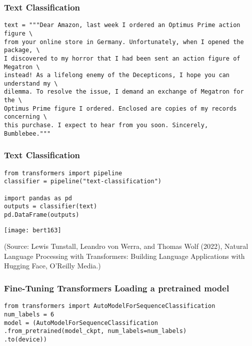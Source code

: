 \begin{frame}[fragile]\frametitle{Text Classification}

\begin{lstlisting}
text = """Dear Amazon, last week I ordered an Optimus Prime action figure \
from your online store in Germany. Unfortunately, when I opened the package, \
I discovered to my horror that I had been sent an action figure of Megatron \
instead! As a lifelong enemy of the Decepticons, I hope you can understand my \
dilemma. To resolve the issue, I demand an exchange of Megatron for the \
Optimus Prime figure I ordered. Enclosed are copies of my records concerning \
this purchase. I expect to hear from you soon. Sincerely, Bumblebee."""
\end{lstlisting}
			
\end{frame}

\begin{frame}[fragile]\frametitle{Text Classification}

\begin{lstlisting}
from transformers import pipeline
classifier = pipeline("text-classification")

import pandas as pd
outputs = classifier(text)
pd.DataFrame(outputs) 
\end{lstlisting}
			
			
			\begin{center}
			\texttt{[image: bert163]}
			\end{center}	
			
			
			{\tiny (Source: Lewis Tunstall, Leandro von Werra, and Thomas Wolf (2022), Natural Language Processing with Transformers:  Building Language Applications with Hugging Face,  O'Reilly Media.)}
\end{frame}

\begin{frame}[fragile]\frametitle{Fine-Tuning Transformers Loading a pretrained model}

\begin{lstlisting}
from transformers import AutoModelForSequenceClassification
num_labels = 6
model = (AutoModelForSequenceClassification
.from_pretrained(model_ckpt, num_labels=num_labels)
.to(device))
\end{lstlisting}
			
			
\end{frame}

